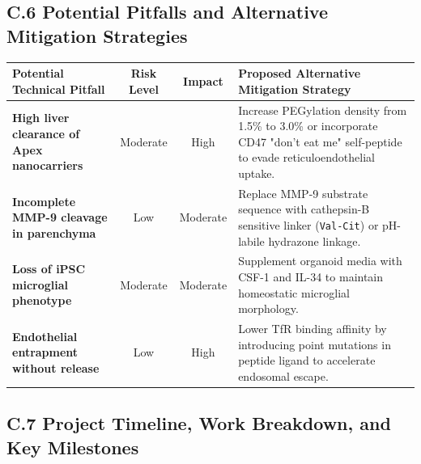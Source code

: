\documentclass[11pt,letterpaper]{article}
\begin{document}
\subsection{C.6 Potential Pitfalls and Alternative Mitigation Strategies}

\begin{alertbox}
\small
{}
\begin{tabularx}{\textwidth}{@{}X c c X@{}}
\toprule
\rowcolor{AlertRed} \color{white}\textbf{Potential Technical Pitfall} & \color{white}\textbf{Risk Level} & \color{white}\textbf{Impact} & \color{white}\textbf{Proposed Alternative Mitigation Strategy} \\
\midrule
\textbf{High liver clearance of Apex nanocarriers} & Moderate & High & Increase PEGylation density from 1.5\% to 3.0\% or incorporate CD47 "don't eat me" self-peptide to evade reticuloendothelial uptake. \\
\textbf{Incomplete MMP-9 cleavage in parenchyma} & Low & Moderate & Replace MMP-9 substrate sequence with cathepsin-B sensitive linker (\texttt{Val-Cit}) or pH-labile hydrazone linkage. \\
\textbf{Loss of iPSC microglial phenotype} & Moderate & Moderate & Supplement organoid media with CSF-1 and IL-34 to maintain homeostatic microglial morphology. \\
\textbf{Endothelial entrapment without release} & Low & High & Lower TfR binding affinity by introducing point mutations in peptide ligand to accelerate endosomal escape. \\
\bottomrule
\end{tabularx}
\end{alertbox}

\vspace{-4pt}

\subsection{C.7 Project Timeline, Work Breakdown, and Key Milestones}
\end{document}
